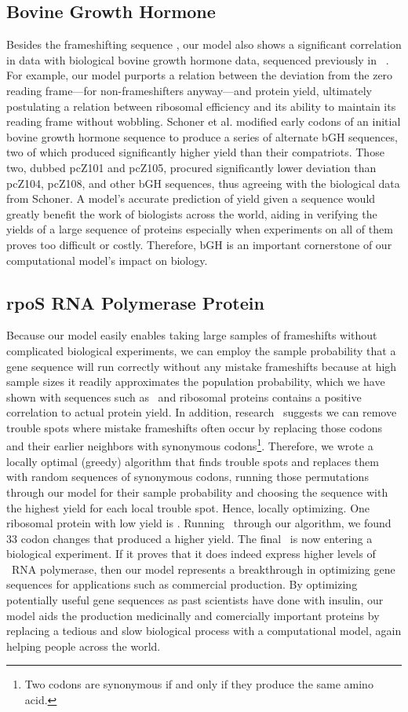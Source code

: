 \documentclass[12pt, draft]{article}
\numberwithin{equation}{section}
\begin{document}
\subsection{Bovine Growth Hormone}
Besides the frameshifting sequence \prfB, our model also shows a significant correlation in data with biological
bovine growth hormone data, sequenced previously in \ecoli~\cite{schoner:bgh}. For example, our model purports a relation
between the deviation from the zero reading frame---for non-frameshifters anyway---and protein yield, ultimately postulating
a relation between ribosomal efficiency and its ability to maintain its reading frame without wobbling. Schoner et al.
modified early codons of an initial bovine growth hormone sequence to produce a series of alternate bGH sequences,
two of which produced significantly higher yield than their compatriots. Those two, dubbed pcZ101 and pcZ105, procured significantly
lower deviation than pcZ104, pcZ108, and other bGH sequences, thus agreeing with the biological data from Schoner.
A model's accurate prediction of yield given a sequence would greatly benefit the work of biologists across the world,
aiding in verifying the yields of a large sequence of proteins especially when experiments on all of them proves too difficult
or costly. Therefore, bGH is an important cornerstone of our computational model's impact on biology.

\subsection{rpoS RNA Polymerase Protein}
Because our model easily enables taking large samples of frameshifts without complicated biological experiments,
we can employ the sample probability that a gene sequence will run correctly without any mistake frameshifts because
at high sample sizes it readily approximates the population probability, which we have shown with sequences such as
\prfB\ and ribosomal proteins contains a positive correlation to actual protein yield. In addition, research~\cite{rare:yield}
suggests we can remove trouble spots where mistake frameshifts often occur by replacing those codons and their
earlier neighbors with synonymous codons\footnote{Two codons are synonymous if and only if they produce the same amino acid.}.
Therefore, we wrote a locally optimal (greedy) algorithm that finds trouble spots and replaces them with random sequences
of synonymous codons, running those permutations through our model for their sample probability and choosing the
sequence with the highest yield for each local trouble spot. Hence, locally optimizing. One ribosomal protein with
low yield is \rpoS. Running \rpoS\ through our algorithm, we found 33 codon changes that produced a higher yield.
The final \rpoS\ is now entering a biological experiment. If it proves that it does indeed express higher levels
of \rpoS\ RNA polymerase, then our model represents a breakthrough in optimizing gene sequences for applications
such as commercial production. By optimizing potentially useful gene sequences as past scientists have done with
insulin, our model aids the production medicinally and comercially important proteins by replacing a tedious and slow
biological process with a computational model, again helping people across the world.

\footnotesize
\begin{singlespace}
  
\end{singlespace}
\end{document}
